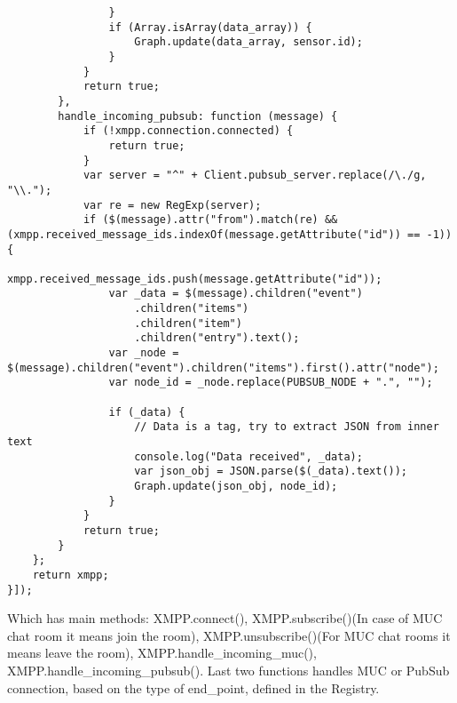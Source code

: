 \begin{lstlisting}
                }
                if (Array.isArray(data_array)) {
                    Graph.update(data_array, sensor.id);
                }
            }
            return true;
        },
        handle_incoming_pubsub: function (message) {
            if (!xmpp.connection.connected) {
                return true;
            }
            var server = "^" + Client.pubsub_server.replace(/\./g, "\\.");
            var re = new RegExp(server);
            if ($(message).attr("from").match(re) && (xmpp.received_message_ids.indexOf(message.getAttribute("id")) == -1)) {
                xmpp.received_message_ids.push(message.getAttribute("id"));
                var _data = $(message).children("event")
                    .children("items")
                    .children("item")
                    .children("entry").text();
                var _node = $(message).children("event").children("items").first().attr("node");
                var node_id = _node.replace(PUBSUB_NODE + ".", "");

                if (_data) {
                    // Data is a tag, try to extract JSON from inner text
                    console.log("Data received", _data);
                    var json_obj = JSON.parse($(_data).text());
                    Graph.update(json_obj, node_id);
                }
            }
            return true;
        }
    };
    return xmpp;
}]);
\end{lstlisting}
Which has main methods: XMPP.connect(), XMPP.subscribe()(In case of MUC chat room it means join the room), XMPP.unsubscribe()(For MUC chat rooms it means leave the room), XMPP.handle\_incoming\_muc(), XMPP.handle\_incoming\_pubsub(). Last two functions handles MUC or PubSub connection, based on the type of end\_point, defined in the Registry.